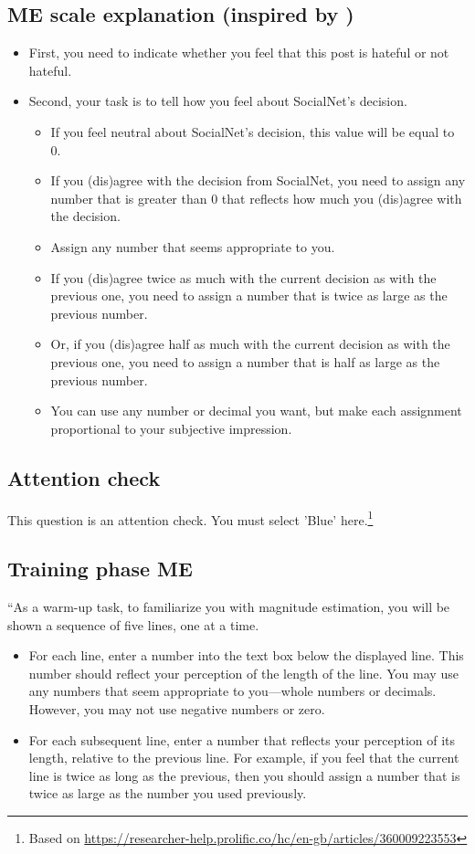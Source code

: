 \documentclass[a4paper]{article}
\begin{document}
\subsection{ME scale explanation (inspired by \cite{moskowitz1977magnitude})}
\begin{itemize}
    \item First, you need to indicate whether you feel that this post is hateful or not hateful.
    \item Second, your task is to tell how you feel about SocialNet's decision.
          \begin{itemize}
              \item If you feel neutral about SocialNet's decision, this value will be equal to 0.
              \item If you (dis)agree with the decision from SocialNet, you need to assign any number that is greater than 0 that reflects how much you (dis)agree with the decision.
              \item Assign any number that seems appropriate to you.
              \item If you (dis)agree twice as much with the current decision as with the previous one, you need to assign a number that is twice as large as the previous number.
              \item Or, if you (dis)agree half as much with the current decision as with the previous one, you need to assign a number that is half as large as the previous number.
              \item You can use any number or decimal you want, but make each assignment proportional to your subjective impression.
          \end{itemize}
\end{itemize}

\subsection{Attention check}
This question is an attention check. You must select 'Blue' here.\footnote{Based on \url{https://researcher-help.prolific.co/hc/en-gb/articles/360009223553}}

\subsection{Training phase ME}
``As a warm-up task, to familiarize you with magnitude estimation, you will be shown a sequence of five lines, one at a time.
\begin{itemize}
    \item For each line, enter a number into the text box below the displayed line. This number should reflect your perception of the length of the line. You may use any numbers that seem appropriate to you—whole numbers or decimals. However, you may not use negative numbers or zero.
    \item For each subsequent line, enter a number that reflects your perception of its length, relative to the previous line. For example, if you feel that the current line is twice as long as the previous, then you should assign a number that is twice as large as the number you used previously.
\end{itemize}
\end{document}
